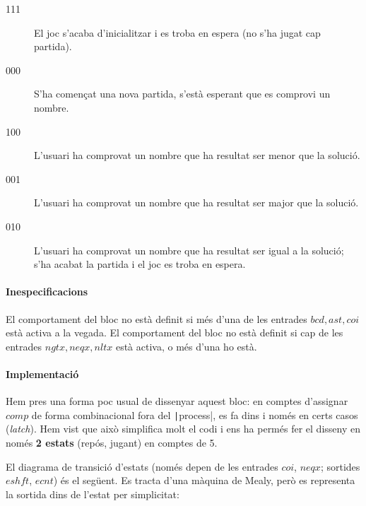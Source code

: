 \begin{description}
\item[111] El joc s'acaba d'inicialitzar i es troba en espera (no s'ha jugat cap partida).
\item[000] S'ha començat una nova partida, s'està esperant que es comprovi un nombre.
\item[100] L'usuari ha comprovat un nombre que ha resultat ser menor que la solució.
\item[001] L'usuari ha comprovat un nombre que ha resultat ser major que la solució.
\item[010] L'usuari ha comprovat un nombre que ha resultat ser igual a la solució;
s'ha acabat la partida i el joc es troba en espera.
\end{description}

\paragraph{Inespecificacions}


El comportament del bloc no està definit si més d'una de les entrades $bcd, ast, coi$ està activa a la vegada.
El comportament del bloc no està definit si cap de les entrades $ngtx, neqx, nltx$ està activa, o més d'una ho està.


\paragraph{Implementació}




Hem pres una forma poc usual de dissenyar aquest bloc: en comptes d'assignar
$comp$ de forma combinacional fora del \texttt|process|, es fa dins
i només en certs casos (\emph{latch}). Hem vist que això simplifica molt el
codi i ens ha permés fer el disseny en només \textbf{2 estats} (repós, jugant)
en comptes de 5.

El diagrama de transició d'estats (només depen de les entrades $coi$, $neqx$; sortides $eshft$, $ecnt$) és el següent. Es tracta
d'una màquina de Mealy, però es representa la sortida dins de l'estat per simplicitat:

\begin{center}  \end{center}

